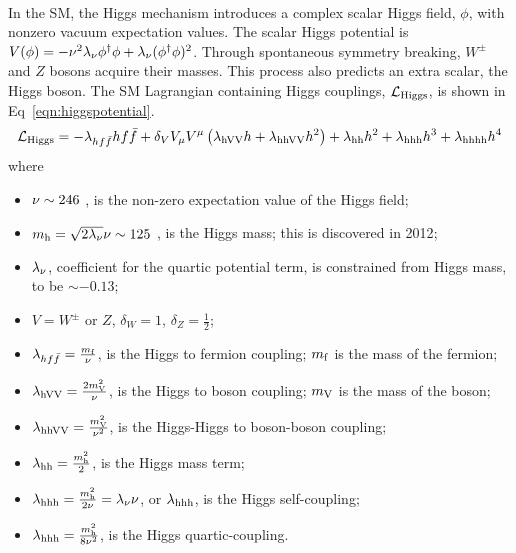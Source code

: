 \paragraph{}
In the SM, the Higgs mechanism introduces a complex scalar Higgs field, $\phi$, with nonzero vacuum expectation values. The scalar Higgs potential is $V(\phi) = -\nu^2\lambda_{\rm \nu} \phi^{\dagger}\phi + \lambda_{\rm \nu}(\phi^\dagger\phi)^2$. Through spontaneous symmetry breaking, $W^{\pm}$ and $Z$ bosons acquire their masses.  This process also predicts an extra scalar, the Higgs boson. The SM Lagrangian containing Higgs couplings, $\mathcal{L}_{\rm Higgs}$, is shown in Eq~\ref{eqn:higgspotential}.
\begin{equation}
\label{eqn:higgspotential}
\mathcal{L}_{\rm Higgs} = -\lambda_{hf\bar{f}} hf\bar{f} + \delta_{V} V_{\rm\mu} V^{\rm\mu}\left(\lambda_{\rm hVV} h + \lambda_{\rm hhVV}h^2\right) + \lambda_{\rm hh}h^2 + \lambda_{\rm hhh}h^3 + \lambda_{\rm hhhh}h^4 
\end{equation}
where 
\begin{itemize}
	\item $\rm\nu \sim 246$ \GeV, is the non-zero expectation value of the Higgs field;\
	\item $m_{\rm h} = \sqrt{2\lambda_{\rm \nu}}\nu \sim 125$ \GeV, is the Higgs mass; this is discovered in 2012\cite{ATLASHiggsDisc, CMSHiggsDisc}; 
	\item $\lambda_{\rm \nu}$, coefficient for the quartic potential term, is constrained from Higgs mass, to be $\sim -0.13$;
	\item $V = W^{\pm}$ or $Z$, $\delta_{W} = 1$, $\delta_{Z} = \frac{1}{2}$;
	\item $\lambda_{hf\bar{f}} = \frac{m_{\rm f}}{\rm\nu}$, is the Higgs to fermion coupling; $m_{\rm f}$ is the mass of the fermion;
	\item $\lambda_{\rm hVV} = \frac{2m_{\rm V}^2}{\rm\nu}$, is the Higgs to boson coupling; $m_{\rm V}$ is the mass of the boson;
	\item $\lambda_{\rm hhVV} = \frac{m_{\rm V}^2}{\rm\nu^2}$, is the Higgs-Higgs to boson-boson coupling;
	\item $\lambda_{\rm hh} = \frac{m_{\rm h}^2}{2}$, is the Higgs mass term;
	\item $\lambda_{\rm hhh} = \frac{m_{\rm h}^2}{2\rm\nu} = \lambda_{\rm \nu} \nu$, or $\lambda_{\rm hhh}$, is the Higgs self-coupling;
	\item $\lambda_{\rm hhh} = \frac{m_{\rm h}^2}{8\rm\nu^2}$, is the Higgs quartic-coupling.
\end{itemize}
